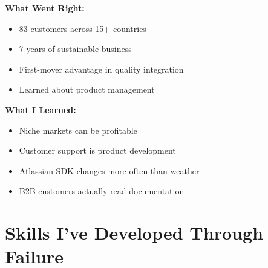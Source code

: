 \documentclass[11pt,a4paper]{article}
\begin{document}
\textbf{What Went Right:}
\begin{itemize}[leftmargin=1.5em, itemsep=0.1em]
\item 83 customers across 15+ countries
\item 7 years of sustainable business
\item First-mover advantage in quality integration
\item Learned about product management
\end{itemize}

\textbf{What I Learned:}
\begin{itemize}[leftmargin=1.5em, itemsep=0.1em]
\item Niche markets can be profitable
\item Customer support is product development
\item Atlassian SDK changes more often than weather
\item B2B customers actually read documentation
\end{itemize}

\section{Skills I've Developed Through Failure}
\end{document}
